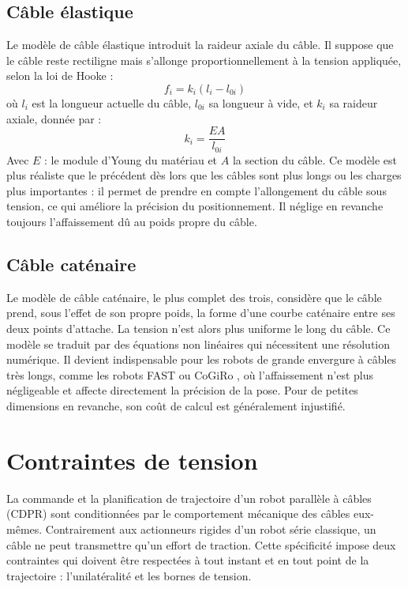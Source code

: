 \subsection{Câble élastique}

Le modèle de câble élastique introduit la raideur axiale du câble. Il suppose que le câble reste rectiligne mais s'allonge proportionnellement à la tension appliquée, selon la loi de Hooke :
\begin{equation}
f_i = k_i (l_i - l_{0i})
\label{eq:hooke}
\end{equation}
où $l_i$ est la longueur actuelle du câble, $l_{0i}$ sa longueur à vide, et $k_i$ sa raideur axiale, donnée par :
\begin{equation}
k_i = \frac{E A}{l_{0i}}
\label{eq:ki}
\end{equation}
Avec $E$ : le module d'Young du matériau et $A$ la section du câble. Ce modèle est plus réaliste que le précédent dès lors que les câbles sont plus longs ou les charges plus importantes : il permet de prendre en compte l'allongement du câble sous tension, ce qui améliore la précision du positionnement. Il néglige en revanche toujours l'affaissement dû au poids propre du câble.

\subsection{Câble caténaire}

Le modèle de câble caténaire, le plus complet des trois, considère que le câble prend, sous l'effet de son propre poids, la forme d'une courbe caténaire entre ses deux points d'attache. La tension n'est alors plus uniforme le long du câble. Ce modèle se traduit par des équations non linéaires qui nécessitent une résolution numérique. Il devient indispensable pour les robots de grande envergure à câbles très longs, comme les robots FAST ou CoGiRo \cite{tho2022}, où l'affaissement n'est plus négligeable et affecte directement la précision de la pose. Pour de petites dimensions en revanche, son coût de calcul est généralement injustifié.

\section{Contraintes de tension}

La commande et la planification de trajectoire d'un robot parallèle à câbles (CDPR) sont conditionnées par le comportement mécanique des câbles eux-mêmes. Contrairement aux actionneurs rigides d'un robot série classique, un câble ne peut transmettre qu'un effort de traction. Cette spécificité impose deux contraintes qui doivent être respectées à tout instant et en tout point de la trajectoire : l'unilatéralité et les bornes de tension.

